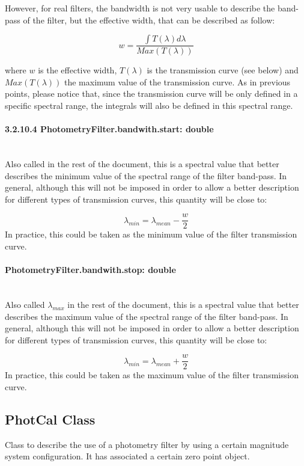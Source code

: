 \documentclass[11pt,a4paper]{ivoa}
\begin{document}
However, for real filters, the bandwidth is not very usable to describe the band-pass of the filter, but the effective width, that can be described as follow:
\par
\[
w = \frac{\int T(\lambda)d\lambda}{Max(T(\lambda))}
\]

where $w$ is the effective width, $T(\lambda)$ is the transmission curve (see below) and $Max(T(\lambda))$ the maximum value of the transmission curve. As in previous points, please notice that, since the transmission curve will be only defined in a specific spectral range, the integrals will also be defined in this spectral range.
\par

\paragraph{3.2.10.4
PhotometryFilter.bandwith.start: double } \hspace{0pt} \\
Also called in the rest of the document, this is a spectral value that better describes the minimum value of the spectral range of the filter band-pass. In general, although this will not be imposed in order to allow a better description for different types of transmission curves, this quantity will be close to:
\par
\[
\lambda_{min} = \lambda_{mean} - \frac{w}{2}
\]
In practice, this could be taken as the minimum value of the filter transmission curve.
\par

\paragraph{PhotometryFilter.bandwith.stop: double} \hspace{0pt} \\
Also called $\lambda_{max}$ in the rest of the document, this is a spectral value that better describes the maximum value of the spectral range of the filter band-pass. In general, although this will not be imposed in order to allow a better description for different types of transmission curves, this quantity will be close to:
\par
\[
\lambda_{min} = \lambda_{mean} + \frac{w}{2}
\]
In practice, this could be taken as the maximum value of the filter transmission curve.\par

\subsection{PhotCal Class}
Class to describe the use of a photometry filter by using a certain magnitude system configuration. It has associated a certain zero point object.
\par
\end{document}
